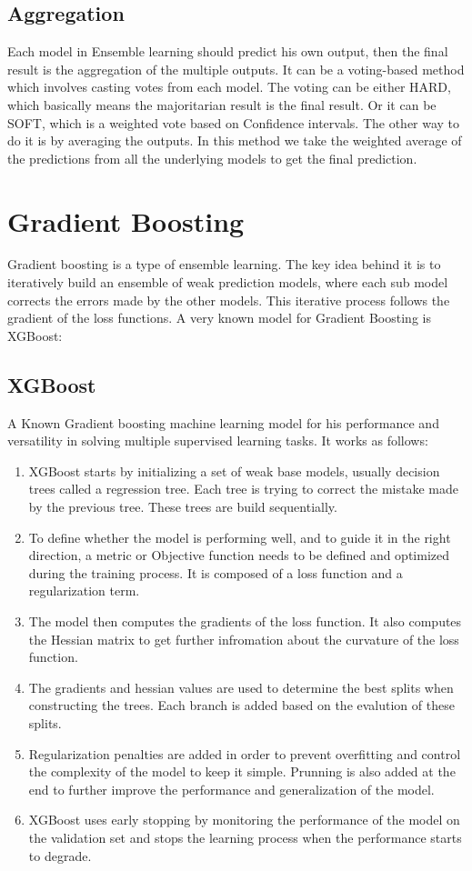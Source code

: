\documentclass[a4paper,12pt,twoside]{report}
\begin{document}
\subsection{Aggregation}
Each model in Ensemble learning should predict his own output, then the final result is the aggregation of the multiple outputs. It can be a voting-based method which involves casting votes from each model. The voting can be either HARD, which basically means the majoritarian result is the final result. Or it can be SOFT, which is a weighted vote based on Confidence intervals.
The other way to do it is by averaging the outputs. In this method we take the weighted average of the predictions from all the underlying models to get the final prediction.
\section{Gradient Boosting}
Gradient boosting is a type of ensemble learning. The key idea behind it is to iteratively build an ensemble of weak prediction models, where each sub model corrects the errors made by the other models. This iterative process follows the gradient of the loss functions.
A very known model for Gradient Boosting is XGBoost:
\subsection{XGBoost}
A Known Gradient boosting machine learning model for his performance and versatility in solving multiple supervised learning tasks. It works as follows:
\begin{enumerate}	
\item XGBoost starts by initializing a set of weak base models, usually decision trees called a regression tree. Each tree is trying to correct the mistake made by the previous tree. These trees are build sequentially.
\item To define whether the model is performing well, and to guide it in the right direction, a metric or Objective function needs to be defined and optimized during the training process. It is composed of a loss function and a regularization term.
\item The model then computes the gradients of the loss function. It also computes the Hessian matrix to get further infromation about the curvature of the loss function.
\item The gradients and hessian values are used to determine the best splits when constructing the trees. Each branch is added based on the evalution of these splits.
\item Regularization penalties are added in order to prevent overfitting and control the complexity of the model to keep it simple. Prunning is also added at the end to further improve the performance and generalization of the model.
\item XGBoost uses early stopping by monitoring the performance of the model on the validation set and stops the learning process when the performance starts to degrade.
\end{enumerate}
\end{document}
